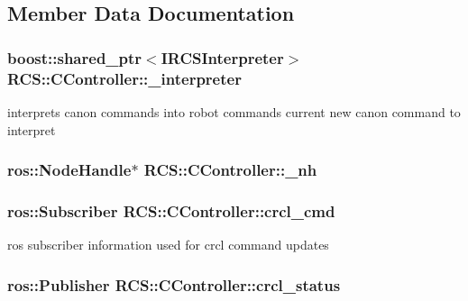 \subsection{Member Data Documentation}
\hypertarget{structRCS_1_1CController_ae5d5ab2480680d7db766f7810232b696}{
\subsubsection[{\-\_\-interpreter}]{\setlength{\rightskip}{0pt plus 5cm}boost\-::shared\-\_\-ptr$<${\bf I\-R\-C\-S\-Interpreter}$>$ R\-C\-S\-::\-C\-Controller\-::\-\_\-interpreter}}\label{structRCS_1_1CController_ae5d5ab2480680d7db766f7810232b696}
interprets canon commands into robot commands current new canon command to interpret \hypertarget{structRCS_1_1CController_aded52f628534d0ebf9558b49b9314fef}{
\subsubsection[{\-\_\-nh}]{\setlength{\rightskip}{0pt plus 5cm}ros\-::\-Node\-Handle$\ast$ R\-C\-S\-::\-C\-Controller\-::\-\_\-nh}}\label{structRCS_1_1CController_aded52f628534d0ebf9558b49b9314fef}
\hypertarget{structRCS_1_1CController_a68d8609778f84a1f4648270d57bcbf8a}{
\subsubsection[{crcl\-\_\-cmd}]{\setlength{\rightskip}{0pt plus 5cm}ros\-::\-Subscriber R\-C\-S\-::\-C\-Controller\-::crcl\-\_\-cmd}}\label{structRCS_1_1CController_a68d8609778f84a1f4648270d57bcbf8a}
ros subscriber information used for crcl command updates \hypertarget{structRCS_1_1CController_a059fc88d65194dc7a78737b80cd88628}{
\subsubsection[{crcl\-\_\-status}]{\setlength{\rightskip}{0pt plus 5cm}ros\-::\-Publisher R\-C\-S\-::\-C\-Controller\-::crcl\-\_\-status}}\label{structRCS_1_1CController_a059fc88d65194dc7a78737b80cd88628}
